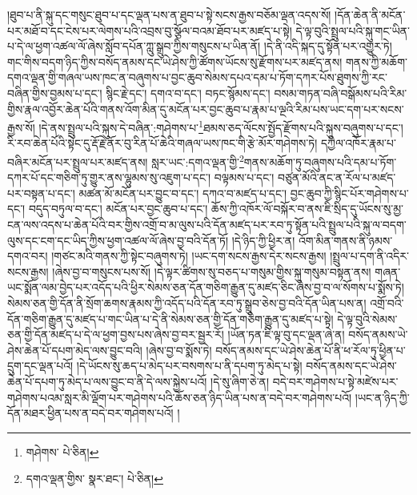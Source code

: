 །ཐུབ་པ་ནི་སྐུ་དང་གསུང་ཐུབ་པ་དང་ལྡན་པས་ན་ཐུབ་པ་སྟེ་སངས་རྒྱས་བཅོམ་ལྡན་འདས་སོ། །དོན་ཆེན་ནི་མངོན་པར་མཐོ་བ་དང་ངེས་པར་ལེགས་པའི་འབྲས་བུ་སྩོལ་བའམ་ཐོབ་པར་མཛད་པ་སྟེ། དེ་ལྟ་བུའི་སྤྲུལ་པའི་སྐུ་གང་ཡིན་པ་དེ་ལ་ཕྱག་འཚལ་ལོ་ཞེས་སློབ་དཔོན་ཀླུ་སྒྲུབ་ཀྱིས་གསུངས་པ་ཡིན་ནོ། །དེ་ནི་འདི་སྐད་དུ་སྟོན་པར་འགྱུར་ཏེ། གང་གིས་བདག་ཉིད་ཀྱིས་བསོད་ནམས་དང་ཡེ་ཤེས་ཀྱི་ཚོགས་ཡོངས་སུ་རྫོགས་པར་མཛད་ནས། གནས་ཀྱི་མཆོག་དགའ་ལྡན་གྱི་གཞལ་ཡས་ཁང་ན་བཞུགས་པ་བྱང་ཆུབ་སེམས་དཔའ་དམ་པ་ཏོག་དཀར་པོས་ཐུགས་ཀྱི་རང་བཞིན་གྱིས་བྱམས་པ་དང་། སྙིང་རྗེ་དང་། དགའ་བ་དང་། བཏང་སྙོམས་དང་། བསམ་གཏན་བཞི་བསྒོམས་པའི་རིམ་གྱིས་རྣལ་འབྱོར་ཆེན་པོའི་གནས་འོག་མིན་དུ་མངོན་པར་བྱང་ཆུབ་པ་རྣམ་པ་ལྔའི་རིམ་པས་ཡང་དག་པར་སངས་རྒྱས་སོ། །དེ་ནས་སྤྲུལ་པའི་སྐུས་དེ་བཞིན་:གཤེགས་པ་\footnote{གཤེགས་  པེ་ཅིན། }ཐམས་ཅད་ལོངས་སྤྱོད་རྫོགས་པའི་སྐུས་བཞུགས་པ་དང་། རི་རབ་ཆེན་པོའི་སྟེང་དུ་རྡོ་རྗེ་ནོར་བུ་རིན་པོ་ཆེའི་གཞལ་ཡས་ཁང་གི་རྩེ་མོར་གཤེགས་ཏེ། དཀྱིལ་འཁོར་རྣམ་པ་བཞིར་མངོན་པར་སྤྲུལ་པར་མཛད་ནས། སླར་ཡང་:དགའ་ལྡན་གྱི་\footnote{དགའ་ལྡན་གྱིས་  སྣར་ཐང་།  པེ་ཅིན། }གནས་མཆོག་ཏུ་བཞུགས་པའི་དམ་པ་ཏོག་དཀར་པོ་དང་གཅིག་ཏུ་གྱུར་ནས་ལྷུམས་སུ་འཇུག་པ་དང་། བལྟམས་པ་དང་། བཙུན་མོའི་ནང་ན་རོལ་པ་མཛད་པར་བསྟན་པ་དང་། མཚན་མོ་མངོན་པར་བྱུང་བ་དང་། དཀའ་བ་མཛད་པ་དང་། བྱང་ཆུབ་ཀྱི་སྙིང་པོར་གཤེགས་པ་དང་། བདུད་བཏུལ་བ་དང་། མངོན་པར་བྱང་ཆུབ་པ་དང་། ཆོས་ཀྱི་འཁོར་ལོ་བསྐོར་བ་ནས་ཇི་སྲིད་དུ་ཡོངས་སུ་མྱ་ངན་ལས་འདས་པ་ཆེན་པོའི་བར་གྱིས་འགྲོ་བ་མ་ལུས་པའི་དོན་མཛད་པར་རབ་ཏུ་སྟོན་པའི་སྤྲུལ་པའི་སྐུ་ལ་བདག་ལུས་དང་ངག་དང་ཡིད་ཀྱིས་ཕྱག་འཚལ་ལོ་ཞེས་བྱ་བའི་དོན་ཏོ། །དེ་ཉིད་ཀྱི་ཕྱིར་ན། འོག་མིན་གནས་ནི་ཉམས་དགའ་བར། །གཙང་མའི་གནས་ཀྱི་སྟེང་བཞུགས་ཏེ། །ཡང་དག་སངས་རྒྱས་དེར་སངས་རྒྱས། །སྤྲུལ་པ་དག་ནི་འདིར་སངས་རྒྱས། །ཞེས་བྱ་བ་གསུངས་པས་སོ། །དེ་ལྟར་ཚིགས་སུ་བཅད་པ་གསུམ་གྱིས་སྐུ་གསུམ་བསྟན་ནས། གཞན་ཡང་སྨོན་ལམ་བྱེད་པར་འདོད་པའི་ཕྱིར་སེམས་ཅན་དོན་གཅིག་རྒྱུན་དུ་མཛད་ཅིང་ཞེས་བྱ་བ་ལ་སོགས་པ་སྨོས་ཏེ། སེམས་ཅན་གྱི་དོན་ནི་སྲོག་ཆགས་རྣམས་ཀྱི་འདོད་པའི་དོན་རབ་ཏུ་སྒྲུབ་ཅེས་བྱ་བའི་དོན་ཡིན་པས་ན། འགྲོ་བའི་དོན་གཅིག་རྒྱུན་དུ་མཛད་པ་གང་ཡིན་པ་དེ་ནི་སེམས་ཅན་གྱི་དོན་གཅིག་རྒྱུན་དུ་མཛད་པ་སྟེ། དེ་ལྟ་བུའི་སེམས་ཅན་གྱི་དོན་མཛད་པ་དེ་ལ་ཕྱག་བྱས་པས་ཞེས་བྱ་བར་སྦྱར་རོ། །ཡོན་ཏན་ཇི་ལྟ་བུ་དང་ལྡན་ཞེ་ན། བསོད་ནམས་ཡེ་ཤེས་ཆེན་པོ་དཔག་མེད་ལས་བྱུང་བའི། །ཞེས་བྱ་བ་སྨོས་ཏེ། བསོད་ནམས་དང་ཡེ་ཤེས་ཆེན་པོ་ནི་ཕ་རོལ་ཏུ་ཕྱིན་པ་དྲུག་དང་ལྡན་པའོ། །དེ་ཡོངས་སུ་ཆད་པ་མེད་པར་བསགས་པ་ནི་དཔག་ཏུ་མེད་པ་སྟེ། བསོད་ནམས་དང་ཡེ་ཤེས་ཆེན་པོ་དཔག་ཏུ་མེད་པ་ལས་བྱུང་བ་ནི་དེ་ལས་སྐྱེས་པའོ། །དེ་སུ་ཞིག་ཅེ་ན། བདེ་བར་གཤེགས་པ་སྟེ་མཛེས་པར་གཤེགས་པའམ་སླར་མི་ལྡོག་པར་གཤེགས་པའི་ཆོས་ཅན་ཉིད་ཡིན་པས་ན་བདེ་བར་གཤེགས་པའོ། །ཡང་ན་ཉིད་ཀྱི་དོན་མཐར་ཕྱིན་པས་ན་བདེ་བར་གཤེགས་པའོ། །
